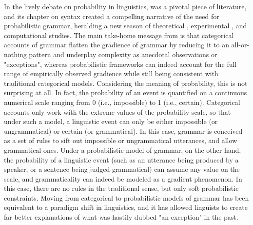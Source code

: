 In the lively debate on probability in linguistics, \textcite{bod2003probabilistic} was a pivotal piece of literature, and its chapter on syntax \parencite{manning2003probabilistic} created a compelling narrative of the need for probabilistic grammar, heralding a new season of theoretical \parencite{wasow2007gradient, CrockerKeller2006, Sprouse2018}, experimental \parencite{KellerSorace2003, bresnan2007probabilistic, BresnanHay2008, BresnanNikitina2008, SoraceKeller2005, AlexopoulouKeller2006, Sprouse2015, BrehmGoldrick2017}, and computational \parencite{TurneyPantel2010} studies. The main take-home message from \textcite{manning2003probabilistic} is that categorical accounts of grammar flatten the gradience of grammar by reducing it to an all-or-nothing pattern and underplay complexity as anecdotal observations or "exceptions", whereas probabilistic frameworks can indeed account for the full range of empirically observed gradience while still being consistent with traditional categorical models. Considering the meaning of probability, this is not surprising at all. In fact, the probability of an event is quantified on a continuous numerical scale ranging from 0 (i.e., impossible) to 1 (i.e., certain). Categorical accounts only work with the extreme values of the probability scale, so that under such a model, a linguistic event can only be either impossible (or ungrammatical) or certain (or grammatical). In this case, grammar is conceived as a set of rules to sift out impossible or ungrammatical utterances, and allow grammatical ones. Under a probabilistic model of grammar, on the other hand, the probability of a linguistic event (such as an utterance being produced by a speaker, or a sentence being judged grammatical) can assume any value on the scale, and grammaticality can indeed be modeled as a gradient phenomenon. In this case, there are no rules in the traditional sense, but only soft probabilistic constraints. Moving from categorical to probabilistic models of grammar has been equivalent to a paradigm shift in linguistics, and it has allowed linguists to create far better explanations of what was hastily dubbed "an exception" in the past.\\
